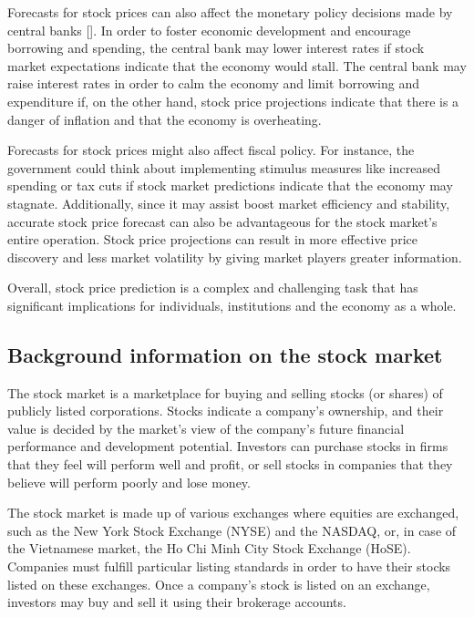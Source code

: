 \documentclass[a4paper]{article}
\begin{document}
Forecasts for stock prices can also affect the monetary policy decisions made by central banks [\cite{li2010impact}]. In order to foster economic development and encourage borrowing and spending, the central bank may lower interest rates if stock market expectations indicate that the economy would stall. The central bank may raise interest rates in order to calm the economy and limit borrowing and expenditure if, on the other hand, stock price projections indicate that there is a danger of inflation and that the economy is overheating.

Forecasts for stock prices might also affect fiscal policy. For instance, the government could think about implementing stimulus measures like increased spending or tax cuts if stock market predictions indicate that the economy may stagnate. Additionally, since it may assist boost market efficiency and stability, accurate stock price forecast can also be advantageous for the stock market's entire operation. Stock price projections can result in more effective price discovery and less market volatility by giving market players greater information.

Overall, stock price prediction is a complex and challenging task that has significant implications for individuals, institutions and the economy as a whole.
\subsection{Background information on the stock market}

The stock market is a marketplace for buying and selling stocks (or shares) of publicly listed corporations. Stocks indicate a company's ownership, and their value is decided by the market's view of the company's future financial performance and development potential. Investors can purchase stocks in firms that they feel will perform well and profit, or sell stocks in companies that they believe will perform poorly and lose money.

The stock market is made up of various exchanges where equities are exchanged, such as the New York Stock Exchange (NYSE) and the NASDAQ, or, in case of the Vietnamese market, the Ho Chi Minh City Stock Exchange (HoSE). Companies must fulfill particular listing standards in order to have their stocks listed on these exchanges. Once a company's stock is listed on an exchange, investors may buy and sell it using their brokerage accounts.
\end{document}
